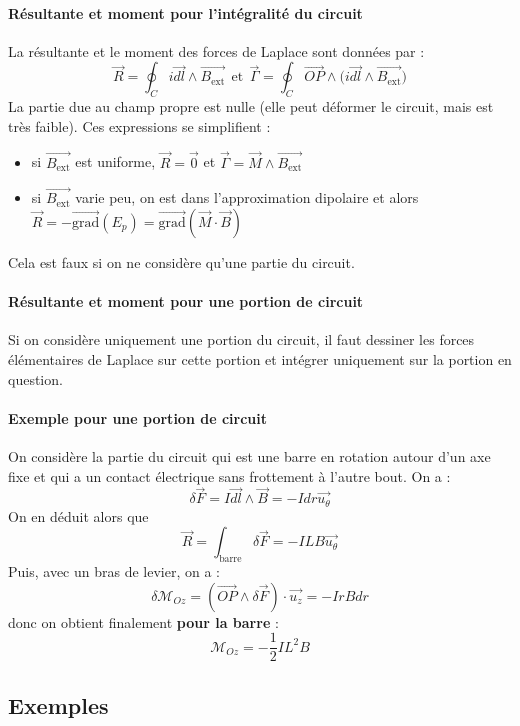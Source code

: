 \documentclass[french]{book}
\theoremstyle{plain}
\theoremstyle{definition}
\theoremstyle{remark}
\newcommand{\grad}{\overrightarrow{\text{grad}}}
\begin{document}
\paragraph{Résultante et moment pour l'intégralité du circuit} La résultante et le moment des forces de Laplace sont données par : $$\overrightarrow{R}=\oint_Ci\overrightarrow{dl}\wedge\overrightarrow{B_\text{ext}} \ \ \text{et} \ \ \overrightarrow{\Gamma}=\oint_C \overrightarrow{OP}\wedge\bigg(i\overrightarrow{dl}\wedge\overrightarrow{B_\text{ext}}\bigg)$$
La partie due au champ propre est nulle (elle peut déformer le circuit, mais est très faible). Ces expressions se simplifient :
\begin{itemize}
	\item si $\overrightarrow{B_\text{ext}}$ est uniforme, $\overrightarrow{R}=\overrightarrow{0}$ et $\overrightarrow{\Gamma}=\overrightarrow{M}\wedge\overrightarrow{B_\text{ext}}$
	\item si $\overrightarrow{B_\text{ext}}$ varie peu, on est dans l'approximation dipolaire et alors $\overrightarrow{R}=-\grad(E_p)=\grad\left(\overrightarrow{M}\cdot\overrightarrow{B}\right)$
\end{itemize}
Cela est faux si on ne considère qu'une partie du circuit.
\paragraph{Résultante et moment pour une portion de circuit} Si on considère uniquement une portion du circuit, il faut dessiner les forces élémentaires de Laplace sur cette portion et intégrer uniquement sur la portion en question.
\paragraph{Exemple pour une portion de circuit} On considère la partie du circuit qui est une barre en rotation autour d'un axe fixe et qui a un contact électrique sans frottement à l'autre bout. On a : $$\delta\overrightarrow{F}=I\overrightarrow{dl}\wedge\overrightarrow{B}=-Idr\overrightarrow{u_\theta}$$ On en déduit alors que $$\overrightarrow{R}=\int_\text{barre}\delta\overrightarrow{F}=-ILB\overrightarrow{u_\theta}$$ Puis, avec un bras de levier, on a : $$\delta\mathcal{M}_{Oz}=\left(\overrightarrow{OP}\wedge\delta\overrightarrow{F}\right)\cdot\overrightarrow{u_z}=-IrBdr$$ donc on obtient finalement \textbf{pour la barre} : $$\mathcal{M}_{Oz}=-\frac12IL^2B$$
\subsection{Exemples}
\end{document}
